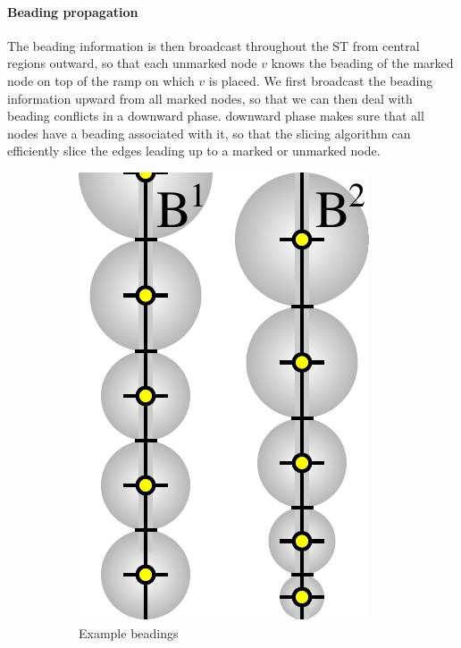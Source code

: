 \paragraph{Beading propagation}
The beading information is then broadcast throughout the ST from central regions outward,
so that each unmarked node $v$ knows the beading of the marked node on top of the ramp on which $v$ is placed.
We first broadcast the beading information upward from all marked nodes,
so that we can then deal with beading conflicts in a downward phase.
 downward phase makes sure that all nodes have a beading associated with it, so that the slicing algorithm can efficiently slice the edges leading up to a marked or unmarked node.	



\begin{figure}
\centering
\setlength{\figheight}{.29\columnwidth}
\begin{subfigure}{0.4\columnwidth}\centering
\includegraphics[height=\figheight]{sources-method-trapezoid-beading-interpolation-beading.pdf}
\caption{Example beadings}\label{example_beading}
\end{subfigure}
\begin{subfigure}{0.4\columnwidth}\centering

\end{subfigure}
\end{figure}
